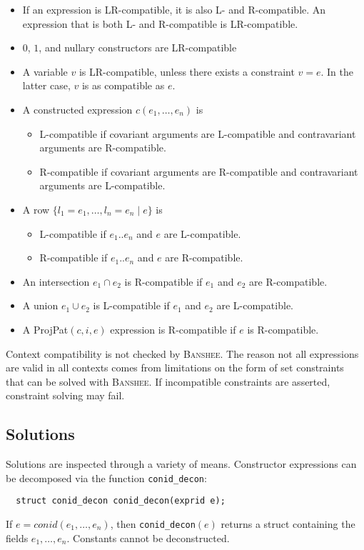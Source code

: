 \documentclass{article}
\newcommand{\banshee}{\textsc{Banshee}}
\newcommand{\ProjPat}{\textsf{ProjPat}}
\begin{document}
\begin{itemize}
\item If an expression is LR-compatible, it is also L- and
R-compatible. An expression that is both L- and R-compatible is LR-compatible. 
\item $0$, $1$, and nullary constructors are LR-compatible
\item A variable $v$ is LR-compatible, unless there exists a
constraint $v=e$. In the latter case, $v$ is as compatible
as $e$.
\item A constructed expression $c(e_1,\ldots,e_n)$ is
        \begin{itemize}
        \item L-compatible if covariant arguments are L-compatible and
        contravariant arguments are R-compatible.
        \item R-compatible if covariant arguments are R-compatible and
        contravariant arguments are L-compatible.
        \end{itemize}
\item A row $\{l_1=e_1,\ldots,l_n=e_n \mid e\}$ is 
        \begin{itemize}
        \item L-compatible if $e_1..e_n$ and $e$ are L-compatible.
        \item R-compatible if $e_1..e_n$ and $e$ are R-compatible.
        \end{itemize}
\item An intersection $e_1 \cap e_2$ is R-compatible if $e_1$ and $e_2$ are R-compatible.
       
\item A union $e_1 \cup e_2$ is L-compatible if $e_1$ and $e_2$ are L-compatible.
      
\item A \ProjPat{}$(c,i,e)$ expression is R-compatible if $e$ is
R-compatible.
\end{itemize}

Context compatibility is not checked by \banshee{}. The reason not all
expressions are valid in all contexts comes from limitations on the
form of set constraints that can be solved with \banshee{}. If
incompatible constraints are asserted, constraint solving may  
fail.

\subsection{Solutions}

Solutions are inspected through a variety of means. Constructor expressions
can be decomposed via the function \texttt{conid\_decon}:
\begin{verbatim}
  struct conid_decon conid_decon(exprid e);
\end{verbatim} 
If $e = conid(e_1,\ldots,e_n)$, then \texttt{conid\_decon}$(e)$ 
returns a struct containing the fields $e_1,\ldots,e_n$. Constants 
cannot be deconstructed.
\end{document}
